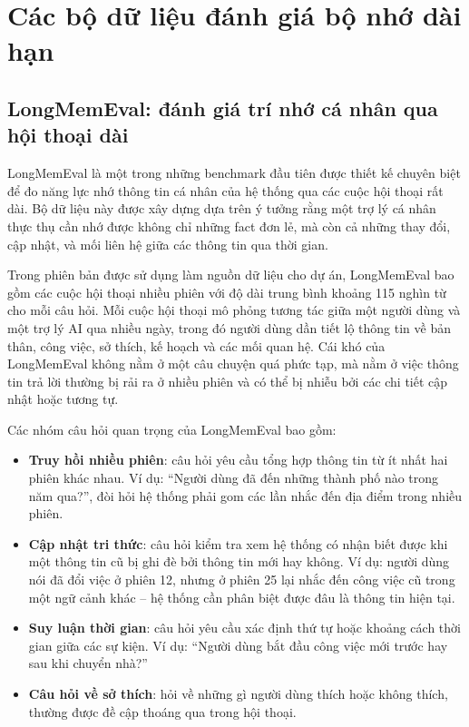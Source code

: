 \documentclass[../main.tex]{subfiles}
\begin{document}
\section{Các bộ dữ liệu đánh giá bộ nhớ dài hạn}

\subsection{LongMemEval: đánh giá trí nhớ cá nhân qua hội thoại dài}

LongMemEval là một trong những benchmark đầu tiên được thiết kế chuyên biệt để đo năng lực nhớ thông tin cá nhân của hệ thống qua các cuộc hội thoại rất dài. Bộ dữ liệu này được xây dựng dựa trên ý tưởng rằng một trợ lý cá nhân thực thụ cần nhớ được không chỉ những fact đơn lẻ, mà còn cả những thay đổi, cập nhật, và mối liên hệ giữa các thông tin qua thời gian.

Trong phiên bản được sử dụng làm nguồn dữ liệu cho dự án, LongMemEval bao gồm các cuộc hội thoại nhiều phiên với độ dài trung bình khoảng 115 nghìn từ cho mỗi câu hỏi. Mỗi cuộc hội thoại mô phỏng tương tác giữa một người dùng và một trợ lý AI qua nhiều ngày, trong đó người dùng dần tiết lộ thông tin về bản thân, công việc, sở thích, kế hoạch và các mối quan hệ. Cái khó của LongMemEval không nằm ở một câu chuyện quá phức tạp, mà nằm ở việc thông tin trả lời thường bị rải ra ở nhiều phiên và có thể bị nhiễu bởi các chi tiết cập nhật hoặc tương tự.

Các nhóm câu hỏi quan trọng của LongMemEval bao gồm:

\begin{itemize}
    \item \textbf{Truy hồi nhiều phiên}: câu hỏi yêu cầu tổng hợp thông tin từ ít nhất hai phiên khác nhau. Ví dụ: ``Người dùng đã đến những thành phố nào trong năm qua?'', đòi hỏi hệ thống phải gom các lần nhắc đến địa điểm trong nhiều phiên.
    \item \textbf{Cập nhật tri thức}: câu hỏi kiểm tra xem hệ thống có nhận biết được khi một thông tin cũ bị ghi đè bởi thông tin mới hay không. Ví dụ: người dùng nói đã đổi việc ở phiên 12, nhưng ở phiên 25 lại nhắc đến công việc cũ trong một ngữ cảnh khác -- hệ thống cần phân biệt được đâu là thông tin hiện tại.
    \item \textbf{Suy luận thời gian}: câu hỏi yêu cầu xác định thứ tự hoặc khoảng cách thời gian giữa các sự kiện. Ví dụ: ``Người dùng bắt đầu công việc mới trước hay sau khi chuyển nhà?''
    \item \textbf{Câu hỏi về sở thích}: hỏi về những gì người dùng thích hoặc không thích, thường được đề cập thoáng qua trong hội thoại.
\end{itemize}
\end{document}
